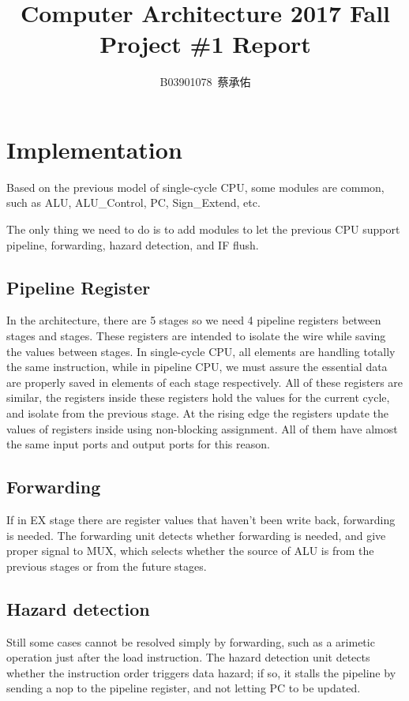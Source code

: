 \documentclass{article}
\title{Computer Architecture 2017 Fall Project \#1 Report}
\author{B03901078\, 蔡承佑}
\begin{document}
\newcommand{\red}[1]{\textcolor{red}{#1}}
\newcommand{\br}[1]{\left( #1 \right)}
\newcommand{\sbr}[1]{\left[ #1 \right]}
\maketitle
\section{Implementation}
Based on the previous model of single-cycle CPU, some modules are common, such as {\cs ALU}, {\cs ALU\_Control}, {\cs PC}, {\cs Sign\_Extend}, etc.

The only thing we need to do is to add modules to let the previous CPU support pipeline, forwarding, hazard detection, and IF flush.
\subsection{Pipeline Register}
In the architecture, there are 5 stages so we need 4 pipeline registers between stages and stages.
These registers are intended to isolate the wire while saving the values between stages.
In single-cycle CPU, all elements are handling totally the same instruction, while in pipeline CPU, we must assure the essential data 
are properly saved in elements of each stage respectively.
All of these registers are similar, the registers inside these registers hold the values for the current cycle, and isolate from the previous stage.
At the rising edge the registers update the values of registers inside using non-blocking assignment.
All of them have almost the same input ports and output ports for this reason.

\subsection{Forwarding}
If in EX stage there are register values that haven't been write back, forwarding is needed.
The forwarding unit detects whether forwarding is needed, and give proper signal to {\cs MUX}, 
which selects whether the source of {\cs ALU} is from the previous stages or from the future stages.

\subsection{Hazard detection}
Still some cases cannot be resolved simply by forwarding, such as a arimetic operation just after the load instruction.
The hazard detection unit detects whether the instruction order triggers data hazard; if so, it stalls the pipeline by sending a {\cs nop} to the pipeline register, 
and not letting PC to be updated.
\end{document}
